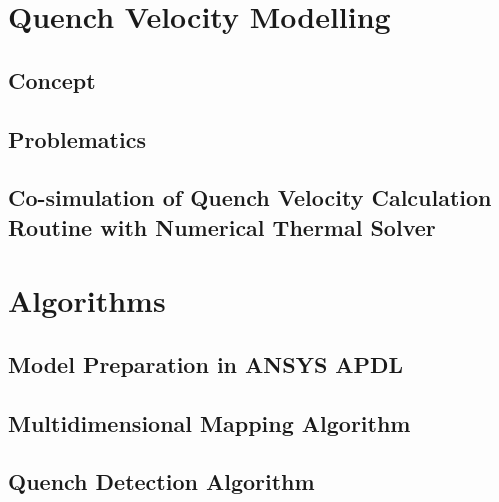 \documentclass[11pt,a4paper]{report}
\begin{document}
\clearpage
\chapter{Quench Velocity Modelling}
\label{chapter:quench_velocity_modelling}

\section{Concept}
\label{section:quench_velocity_concept}


\section{Problematics}
\label{section:quench_velocity_problematics}


\section{Co-simulation of Quench Velocity Calculation Routine with Numerical Thermal Solver}
\label{section:quench_velocity_cosimulation}


\clearpage
\chapter{Algorithms}
\label{chapter:algorithms}


\section{Model Preparation in ANSYS APDL}
\label{section:model_preparation}


\section{Multidimensional Mapping Algorithm}
\label{section:multidimensional_mapping_algorithm}


\section{Quench Detection Algorithm}
\label{section:quench_detection_algorithm}

\end{document}
